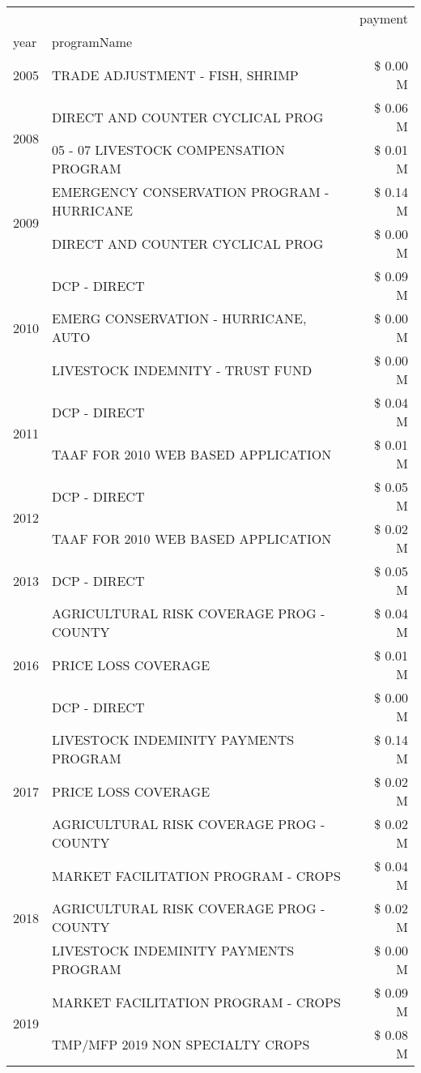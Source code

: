 \begin{tabular}{llr}
\toprule
 &  & payment \\
year & programName &  \\
\midrule
2005 & TRADE ADJUSTMENT - FISH, SHRIMP & \$ 0.00 M \\
\cline{1-3}
\multirow[t]{2}{*}{2008} & DIRECT AND COUNTER CYCLICAL PROG & \$ 0.06 M \\
 & 05 - 07 LIVESTOCK COMPENSATION PROGRAM & \$ 0.01 M \\
\cline{1-3}
\multirow[t]{2}{*}{2009} & EMERGENCY CONSERVATION PROGRAM - HURRICANE & \$ 0.14 M \\
 & DIRECT AND COUNTER CYCLICAL PROG & \$ 0.00 M \\
\cline{1-3}
\multirow[t]{3}{*}{2010} & DCP - DIRECT & \$ 0.09 M \\
 & EMERG CONSERVATION - HURRICANE, AUTO & \$ 0.00 M \\
 & LIVESTOCK INDEMNITY - TRUST FUND & \$ 0.00 M \\
\cline{1-3}
\multirow[t]{2}{*}{2011} & DCP - DIRECT & \$ 0.04 M \\
 & TAAF FOR 2010 WEB BASED APPLICATION & \$ 0.01 M \\
\cline{1-3}
\multirow[t]{2}{*}{2012} & DCP - DIRECT & \$ 0.05 M \\
 & TAAF FOR 2010 WEB BASED APPLICATION & \$ 0.02 M \\
\cline{1-3}
2013 & DCP - DIRECT & \$ 0.05 M \\
\cline{1-3}
\multirow[t]{3}{*}{2016} & AGRICULTURAL RISK COVERAGE PROG - COUNTY & \$ 0.04 M \\
 & PRICE LOSS COVERAGE & \$ 0.01 M \\
 & DCP - DIRECT & \$ 0.00 M \\
\cline{1-3}
\multirow[t]{3}{*}{2017} & LIVESTOCK INDEMINITY PAYMENTS PROGRAM & \$ 0.14 M \\
 & PRICE LOSS COVERAGE & \$ 0.02 M \\
 & AGRICULTURAL RISK COVERAGE PROG - COUNTY & \$ 0.02 M \\
\cline{1-3}
\multirow[t]{3}{*}{2018} & MARKET FACILITATION PROGRAM - CROPS & \$ 0.04 M \\
 & AGRICULTURAL RISK COVERAGE PROG - COUNTY & \$ 0.02 M \\
 & LIVESTOCK INDEMINITY PAYMENTS PROGRAM & \$ 0.00 M \\
\cline{1-3}
\multirow[t]{3}{*}{2019} & MARKET FACILITATION PROGRAM - CROPS & \$ 0.09 M \\
 & TMP/MFP 2019 NON SPECIALTY CROPS & \$ 0.08 M \\

\end{tabular}
